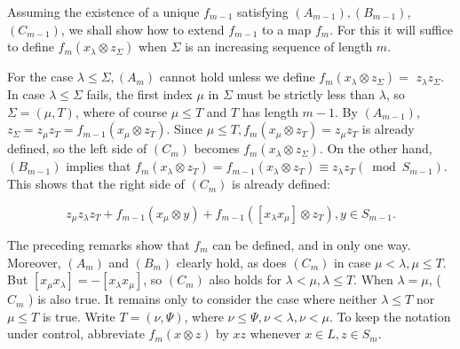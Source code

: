 \documentclass[10pt]{article}
\begin{document}
Assuming the existence of a unique $f_{m-1}$ satisfying $\left(A_{m-1}\right),\left(B_{m-1}\right)$, $\left(C_{m-1}\right)$, we shall show how to extend $f_{m-1}$ to a map $f_{m}$. For this it will suffice to define $f_{m}\left(x_{\lambda} \otimes z_{\Sigma}\right)$ when $\Sigma$ is an increasing sequence of length $m$.

For the case $\lambda \leq \Sigma,\left(A_{m}\right)$ cannot hold unless we define $f_{m}\left(x_{\lambda} \otimes z_{\Sigma}\right)=$ $z_{\lambda} z_{\Sigma}$. In case $\lambda \leq \Sigma$ fails, the first index $\mu$ in $\Sigma$ must be strictly less than $\lambda$, so $\Sigma=(\mu, T)$, where of course $\mu \leq T$ and $T$ has length $m-1$. By $\left(A_{m-1}\right)$, $z_{\Sigma}=z_{\mu} z_{T}=f_{m-1}\left(x_{\mu} \otimes z_{T}\right)$. Since $\mu \leq T, f_{m}\left(x_{\mu} \otimes z_{T}\right)=z_{\mu} z_{T}$ is already defined, so the left side of $\left(C_{m}\right)$ becomes $f_{m}\left(x_{\lambda} \otimes z_{\Sigma}\right)$. On the other hand, $\left(B_{m-1}\right)$ implies that $f_{m}\left(x_{\lambda} \otimes z_{T}\right)=f_{m-1}\left(x_{\lambda} \otimes z_{T}\right) \equiv z_{\lambda} z_{T}\left(\bmod S_{m-1}\right)$. This shows that the right side of $\left(C_{m}\right)$ is already defined:

$$
z_{\mu} z_{\lambda} z_{T}+f_{m-1}\left(x_{\mu} \otimes y\right)+f_{m-1}\left(\left[x_{\lambda} x_{\mu}\right] \otimes z_{T}\right), y \in S_{m-1} .
$$

The preceding remarks show that $f_{m}$ can be defined, and in only one way. Moreover, $\left(A_{m}\right)$ and $\left(B_{m}\right)$ clearly hold, as does $\left(C_{m}\right)$ in case $\mu<\lambda, \mu \leq T$. But $\left[x_{\mu} x_{\lambda}\right]=-\left[x_{\lambda} x_{\mu}\right]$, so $\left(C_{m}\right)$ also holds for $\lambda<\mu, \lambda \leq T$. When $\lambda=\mu$, ( $C_{m}$ ) is also true. It remains only to consider the case where neither $\lambda \leq T$ nor $\mu \leq T$ is true. Write $T=(\nu, \Psi)$, where $\nu \leq \Psi, \nu<\lambda, \nu<\mu$. To keep the notation under control, abbreviate $f_{m}(x \otimes z)$ by $x z$ whenever $x \in L, z \in S_{m}$.
\end{document}
